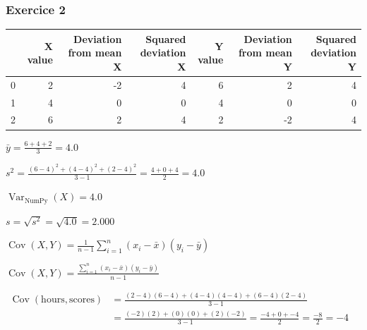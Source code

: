 \documentclass[11pt]{article}
\begin{document}
    \subsubsection{Exercice 2}\label{exercice-2}

    
    \begin{tabular}{lrrrrrr}
\toprule
 & X value & Deviation from mean X  & Squared deviation X & Y value & Deviation from mean Y & Squared deviation Y \\
\midrule
0 & 2 & -2 & 4 & 6 & 2 & 4 \\
1 & 4 & 0 & 0 & 4 & 0 & 0 \\
2 & 6 & 2 & 4 & 2 & -2 & 4 \\
\bottomrule
\end{tabular}


    
    $\displaystyle \bar{y} = \frac{6+4+2}{3} = 4.0$

    
    $\displaystyle s^2 = \frac{(6-4)^2+(4-4)^2+(2-4)^2}{3-1} = \frac{4+0+4}{2} = 4.0$

    
    $\displaystyle \operatorname{Var}_{\mathrm{NumPy}}(X) = 4.0$

    
    $\displaystyle s = \sqrt{s^2} = \sqrt{4.0} = 2.000$

    
    $\displaystyle \operatorname{Cov}(X,Y)=\frac{1}{n-1}\sum_{i=1}^n(x_i-\bar{x})(y_i-\bar{y})$

    
    $\displaystyle \operatorname{Cov}(X,Y) = \frac{\sum_{i=1}^{n}(x_i-\bar{x})(y_i-\bar{y})}{n-1}$

    
    $\displaystyle \begin{aligned}\boxed{\operatorname{Cov}(\mathrm{hours},\mathrm{scores})} &= \frac{(2-4)(6-4) + (4-4)(4-4) + (6-4)(2-4)}{3-1} \\[6pt] &= \frac{(-2)(2) + (0)(0) + (2)(-2)}{3-1} = \frac{-4 + 0 + -4}{2} = \frac{-8}{2} = \boxed{-4}\end{aligned}$
\end{document}
